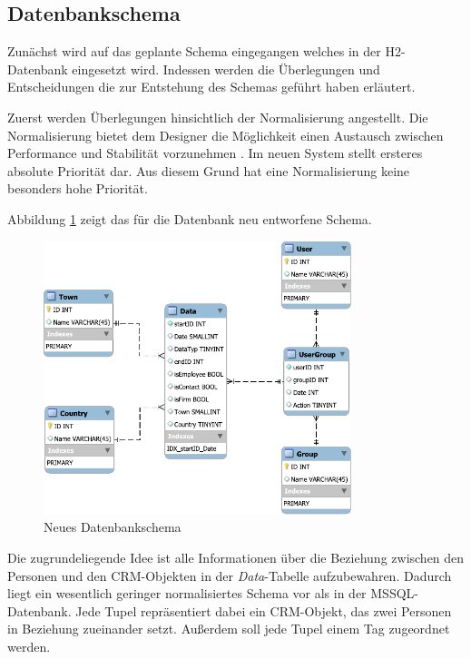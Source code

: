 \subsection{Datenbankschema}

Zunächst wird auf das geplante Schema eingegangen welches in der H2-Datenbank eingesetzt wird. Indessen werden die Überlegungen und Entscheidungen die zur Entstehung des Schemas geführt haben erläutert. 

Zuerst werden Überlegungen hinsichtlich der Normalisierung angestellt. Die Normalisierung bietet dem Designer die Möglichkeit einen Austausch zwischen Performance und Stabilität vorzunehmen \cite{geisler2011datenbanken}. Im neuen System stellt ersteres absolute Priorität dar. Aus diesem Grund hat eine Normalisierung keine besonders hohe Priorität.

Abbildung \ref{konzept_SchemaNeu} zeigt das für die Datenbank neu entworfene Schema. 

\begin{figure}[htbp]
\centering
  \includegraphics[width=0.8\textwidth, width=0.8\textwidth]{pics/NewSchema.pdf}
\caption{Neues Datenbankschema}
\label{konzept_SchemaNeu}
\end{figure} 

Die zugrundeliegende Idee ist alle Informationen über die Beziehung zwischen den Personen und den CRM-Objekten in der \textit{Data}-Tabelle aufzubewahren. Dadurch liegt ein wesentlich geringer normalisiertes Schema vor als in der MSSQL-Datenbank. Jede Tupel repräsentiert dabei ein CRM-Objekt, das zwei Personen in Beziehung zueinander setzt. Außerdem soll jede Tupel einem Tag zugeordnet werden.

